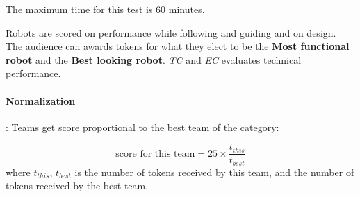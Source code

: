 The maximum time for this test is 60 minutes.

Robots are scored on performance while following and guiding and on design. 
The audience can awards tokens for what they elect to be the \textbf{Most functional robot} and the \textbf{Best looking robot}. 
\textit{TC} and \textit{EC} evaluates technical performance.

\renewcommand{\dataRecordingBonus}{false}
\begin{scorelist}


\end{scorelist}

\paragraph*{Normalization}: Teams get score proportional to the best team of the category:

$$\text{score for this team} = 25 \times \frac{t_{this}}{t_{best}}$$
where $t_{this}$, $t_{best}$ is the number of tokens received by this team, and the number of tokens received by the best team.

\renewcommand{\dataRecordingBonus}{true}
